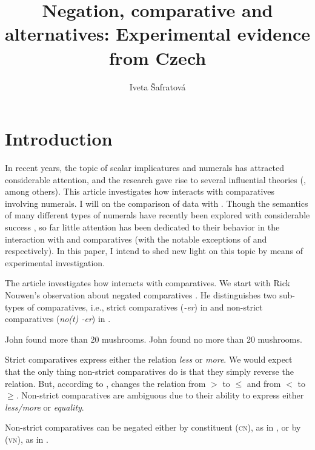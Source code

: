 \documentclass[output=paper, colorlinks, citecolor=brown, newtxmath]{langsci/langscibook}
\title{Negation, comparative and alternatives: Experimental evidence from Czech}
\author{Iveta Šafratová\affiliation{Masaryk University in Brno}}
\begin{document}
\maketitle

\section{Introduction}

In recent years, the topic of scalar implicatures and numerals has attracted considerable attention, and the research gave rise to several influential theories (\citealt{larson1988scope,krifka1999least,sauerland2004scalar,fox2006universal}, among others). This article investigates how  interacts with comparatives involving numerals. I will  on the comparison of  data with . Though the semantics of many different types of  numerals have recently been explored with considerable success  \citep[e.g.][]{docekal2013numerals,wagiel2014boys,wagiel2015sums}, so far little attention has been dedicated to their behavior in the interaction with  and comparatives (with the notable exceptions of \citealt{dovcekal2017upper} and \citealt{docekal_wagiel2018event} respectively). In this paper, I intend to shed new light on this topic by means of experimental investigation.

The article investigates how  interacts with comparatives. We start with Rick Nouwen's observation about  negated comparatives \citep{nouwen2008upper}. He distinguishes two sub-types of comparatives, i.e., strict comparatives (\textit{-er}) in  and non-strict comparatives (\textit{no(t) -er}) in .

\ea \ea John found more than 20 mushrooms.\label{ex:mush}
\ex John found no more than 20 mushrooms.\label{ex:no_mush}
\z
\z

\noindent Strict comparatives express either the relation \textit{less} or \textit{more}. We would expect that the only thing non-strict comparatives do is that they simply reverse the relation.
But, according to \cite{nouwen2008upper}, 
changes the relation from $>$ to $\leq$ and from $<$ to $\geq$. Non-strict comparatives are ambiguous due to
their ability to express either \textit{less/more} or \textit{equality}.

Non-strict comparatives can be negated either by constituent  (\textsc{cn}), as in , or by  (\textsc{vn}), as in .
\end{document}
